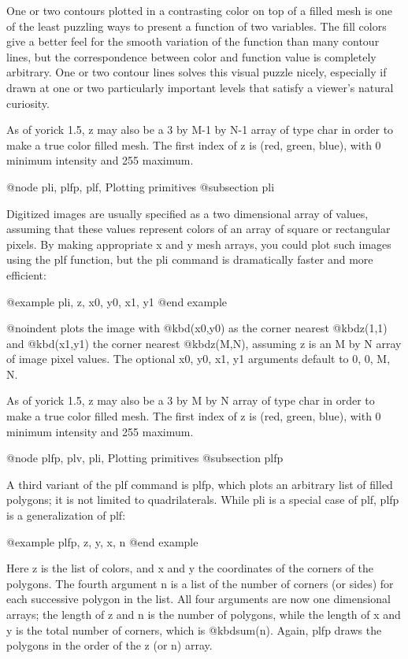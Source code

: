 One or two contours plotted in a contrasting color on top of a filled
mesh is one of the least puzzling ways to present a function of two
variables.  The fill colors give a better feel for the smooth
variation of the function than many contour lines, but the
correspondence between color and function value is completely
arbitrary.  One or two contour lines solves this visual puzzle nicely,
especially if drawn at one or two particularly important levels that
satisfy a viewer's natural curiosity.

As of yorick 1.5, z may also be a 3 by M-1 by N-1 array of type char in
order to make a true color filled mesh.  The first index of z is (red,
green, blue), with 0 minimum intensity and 255 maximum.

@node pli, plfp, plf, Plotting primitives
@subsection pli

Digitized images are usually specified as a two dimensional array of
values, assuming that these values represent colors of an array of
square or rectangular pixels.  By making appropriate x and y mesh
arrays, you could plot such images using the plf function, but the pli
command is dramatically faster and more efficient:

@example
pli, z, x0, y0, x1, y1
@end example

@noindent
plots the image with @kbd{(x0,y0)} as the corner nearest @kbd{z(1,1)}
and @kbd{(x1,y1)} the corner nearest @kbd{z(M,N)}, assuming z is an M by
N array of image pixel values.  The optional x0, y0, x1, y1 arguments
default to 0, 0, M, N.

As of yorick 1.5, z may also be a 3 by M by N array of type char in
order to make a true color filled mesh.  The first index of z is (red,
green, blue), with 0 minimum intensity and 255 maximum.

@node plfp, plv, pli, Plotting primitives
@subsection plfp

A third variant of the plf command is plfp, which plots an arbitrary
list of filled polygons; it is not limited to quadrilaterals.  While
pli is a special case of plf, plfp is a generalization of plf:

@example
plfp, z, y, x, n
@end example

Here z is the list of colors, and x and y the coordinates of the corners
of the polygons.  The fourth argument n is a list of the number of
corners (or sides) for each successive polygon in the list.  All four
arguments are now one dimensional arrays; the length of z and n is the
number of polygons, while the length of x and y is the total number of
corners, which is @kbd{sum(n)}.  Again, plfp draws the polygons in the
order of the z (or n) array.

